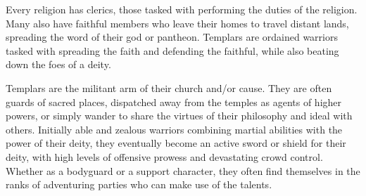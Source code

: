 
\newcommand{\vow}[6]{
\option{\textbf{Vow of #1}\\
\textit{``#2''}
\listone \item \ability{First:}{#3} \item \ability{Second:}{#4} \item \ability{Third:}{#5} \end{list}
\vspace{8pt}
\ability{Roleplaying Ideas:}{#6}
}}

\newcommand{\specialvow}[7]{
\option{\textbf{Vow of #1}\\
\textit{``#2''}
\listone \item \ability{First:}{#3} \item \ability{Second:}{#4} \item \ability{Third:}{#5} \end{list}
\vspace{8pt}
\ability{Special:}{#7}
\ability{Roleplaying Ideas:}{#6}
}}

\newcommand{\faith}[7]{
\option{\textbf{#1}\\
#2
\listnum
	\item #3
	\item #4
	\item #5
	\item #6
	\item #7
\end{list}
}}

\goodbab
\goodfor
\poorref
\goodwil
{}

\noindent Every religion has clerics, those tasked with performing the duties of the religion. Many also have faithful members who leave their homes to travel distant lands, spreading the word of their god or pantheon. Templars are ordained warriors tasked with spreading the faith and defending the faithful, while also beating down the foes of a deity.

Templars are the militant arm of their church and/or cause. They are often guards of sacred places, dispatched away from the temples as agents of higher powers, or simply wander to share the virtues of their philosophy and ideal with others. Initially able and zealous warriors combining martial abilities with the power of their deity, they eventually become an active sword or shield for their deity, with high levels of offensive prowess and devastating crowd control. Whether as a bodyguard or a support character, they often find themselves in the ranks of adventuring parties who can make use of the talents.

